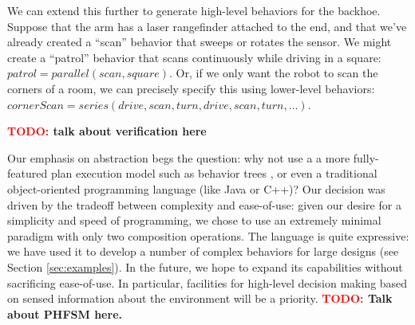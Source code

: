 \documentclass[graybox]{svmult}
\newcommand{\TODO}[1]{ {\bf \textcolor{red}{TODO:} #1 }}
\begin{document}
We can extend this further to generate high-level behaviors for the
backhoe.  Suppose that the arm has a laser rangefinder attached to the end,
and that we've already created a ``scan'' behavior that sweeps or rotates the
sensor.  We might create a ``patrol'' behavior that scans continuously while
driving in a square: \(patrol = parallel( scan, square)\). Or, if we only want
the robot to scan the corners of a room, we can precisely specify this using
lower-level behaviors:  \(cornerScan=series(drive, scan, turn, drive,scan,
turn, \ldots) \).


\TODO{talk about verification here}

Our emphasis on abstraction begs the question: why not use  a a more fully-featured
plan execution model such as behavior trees \cite{marzinotto2014towards}, or even a
traditional object-oriented programming language (like Java or C++)?  Our
decision was driven by the tradeoff between complexity and ease-of-use: given
our desire for a simplicity and speed of programming, we chose to use an
extremely minimal  paradigm with only two composition operations.
The language is quite expressive: we have used it to develop a number of  complex behaviors
for large designs (see Section \ref{sec:examples}). In the future, we hope to expand
its capabilities without sacrificing ease-of-use.  In particular, facilities
for high-level decision making based on sensed information about the environment
will be a priority.
\TODO{Talk about PHFSM here.}
\end{document}
